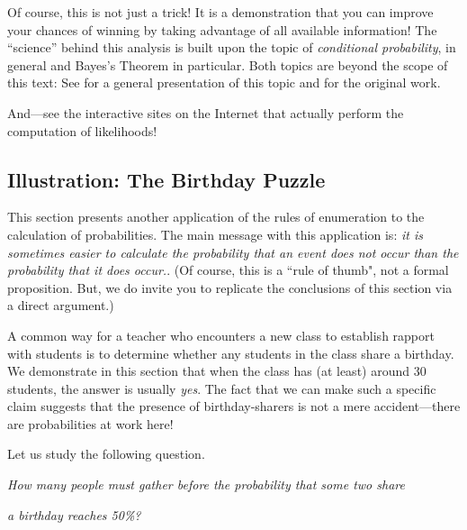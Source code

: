 Of course, this is not just a trick!  It is a demonstration that you
can improve your chances of winning by taking advantage of all
available information!  The ``science'' behind this analysis is built
upon the topic of {\em conditional probability},
 in general and Bayes's Theorem in
particular.   Both topics are beyond the scope
of this text: See \cite{Lee12} for a general presentation of this
topic and \cite{Bayes} for the original work.

And---see the interactive sites on the Internet that actually perform the
computation of likelihoods!


\subsection{Illustration: The Birthday Puzzle}
\label{sec:birthday-puzzle}

This section presents another application of the rules of enumeration
to the calculation of probabilities.%
The main message with this application is: {\em it is sometimes easier to
  calculate the probability that an event {\em does not} occur than
  the probability that it {\em does} occur.}. (Of course, this is a ``rule of thumb",
  not a formal proposition. But, we do invite you to replicate the conclusions of
  this section via a direct argument.)

\medskip

A common way for a teacher who encounters a new class to establish rapport with
students is to determine whether any students in the class share a birthday.  We
demonstrate in this section that when the class has (at least) around 30 students, 
the answer is usually \textit{yes}.  The fact that we can make such a specific claim 
suggests that the presence of birthday-sharers is not a mere accident---there are
probabilities at work here!

\smallskip

Let us study the following question.

\smallskip

{\it How many people must gather before the probability that some two share}

{\it a birthday reaches 50\%?}

\bigskip

\noindent {}

